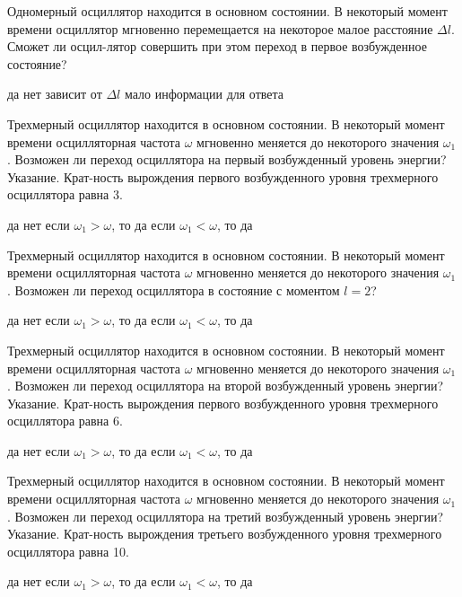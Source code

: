 \documentclass[11pt,a4paper]{exam}
\begin{document}
\begin{questions}
\question Одномерный осциллятор находится в основном состоянии. В некоторый момент времени осциллятор мгновенно перемещается на некоторое малое расстояние $\Delta l$. Сможет ли осцил-лятор совершить при этом переход в первое возбужденное состояние?
\begin{choices}
\choice да
\choice нет
\choice зависит от $\Delta l$
\choice мало информации для ответа
\end{choices}

\question Трехмерный осциллятор находится в основном состоянии. В некоторый момент времени осцилляторная частота $\omega $ мгновенно меняется до некоторого значения ${\omega _1}$. Возможен ли переход осциллятора на первый возбужденный уровень энергии? Указание. Крат-ность вырождения первого возбужденного уровня трехмерного осциллятора равна 3.
\begin{choices}
\choice да    
\choice нет      
\choice если ${\omega _1} > \omega $, то да    
\choice если ${\omega _1} < \omega $, то да
\end{choices}

\question  Трехмерный осциллятор находится в основном состоянии. В некоторый момент времени осцилляторная частота $\omega $ мгновенно меняется до некоторого значения ${\omega _1}$. Возможен ли переход осциллятора в состояние с моментом $l = 2$?
\begin{choices}
\choice да    
\choice нет      
\choice если ${\omega _1} > \omega $, то да    
\choice если ${\omega _1} < \omega $, то да
\end{choices}

\question Трехмерный осциллятор находится в основном состоянии. В некоторый момент времени осцилляторная частота $\omega $ мгновенно меняется до некоторого значения ${\omega _1}$. Возможен ли переход осциллятора на второй возбужденный уровень энергии? Указание. Крат-ность вырождения первого возбужденного уровня трехмерного осциллятора равна 6.
\begin{choices}
\choice да    
\choice нет      
\choice если ${\omega _1} > \omega $, то да    
\choice если ${\omega _1} < \omega $, то да
\end{choices}

\question Трехмерный осциллятор находится в основном состоянии. В некоторый момент времени осцилляторная частота $\omega $ мгновенно меняется до некоторого значения ${\omega _1}$. Возможен ли переход осциллятора на третий возбужденный уровень энергии? Указание. Крат-ность вырождения третьего возбужденного уровня трехмерного осциллятора равна 10.
\begin{choices}
\choice да    
\choice нет      
\choice если ${\omega _1} > \omega $, то да    
\choice если ${\omega _1} < \omega $, то да
\end{choices}


\end{questions}
\end{document}
